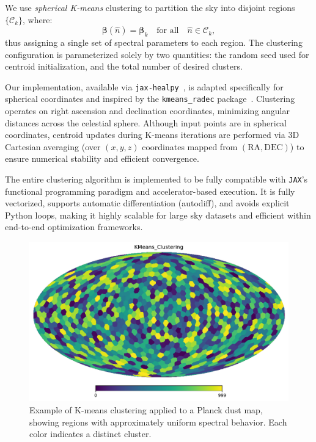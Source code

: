 \documentclass[%
 reprint,
bibnotes,
 amsmath,amssymb,
 aps,
floatfix, 
]{revtex4-2}
\begin{document}
We use \textit{spherical K-means} clustering to partition the sky into disjoint regions \( \{ \mathcal{C}_k \} \), where:
\[
\boldsymbol{\beta}(\hat{n}) = \boldsymbol{\beta}_k \quad \text{for all} \quad \hat{n} \in \mathcal{C}_k,
\]
thus assigning a single set of spectral parameters to each region. The clustering configuration is parameterized solely by two quantities: the random seed used for centroid initialization, and the total number of desired clusters.

Our implementation, available via \texttt{jax-healpy}~\citep{JAXHEALPY}, is adapted specifically for spherical coordinates and inspired by the \texttt{kmeans\_radec} package~\citep{KMEANSRADEC}. Clustering operates on right ascension and declination coordinates, minimizing angular distances across the celestial sphere. Although input points are in spherical coordinates, centroid updates during K-means iterations are performed via 3D Cartesian averaging (over \((x, y, z)\) coordinates mapped from \((\text{RA}, \text{DEC})\)) to ensure numerical stability and efficient convergence.

The entire clustering algorithm is implemented to be fully compatible with \texttt{JAX}'s functional programming paradigm and accelerator-based execution. It is fully vectorized, supports automatic differentiation (autodiff), and avoids explicit Python loops, making it highly scalable for large sky datasets and efficient within end-to-end optimization frameworks.


\begin{figure}[h]
    \centering
    \includegraphics[width=\linewidth]{figures/kmeans_clustering.pdf}
    \caption{Example of K-means clustering applied to a Planck dust map, showing regions with approximately uniform spectral behavior. Each color indicates a distinct cluster.}
    \label{fig:kmeans_clusters}
\end{figure}
\end{document}
